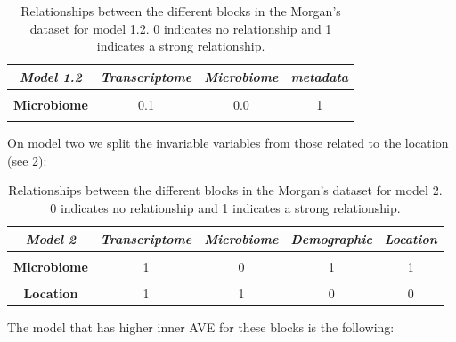 \documentclass[
  12pt,
  a4paper,
  twoside,
  openright]{book}
\begin{document}
\begin{table}[H]

\caption[Model 1.2 of the Morgan's dataset.]{\label{tab:morgan-model1-2}Relationships between the different blocks in the Morgan's dataset for model 1.2. 0 indicates no relationship and 1 indicates a strong relationship.}
\centering
\begin{tabular}[t]{|>{}c|c|c|>{}c|}
\hline
\em{\textbf{Model 1.2}} & \em{\textbf{Transcriptome}} & \em{\textbf{Microbiome}} & \em{\textbf{metadata}}\\
\hline
\textbf{\cellcolor{gray!6}{Transcriptome}} & \cellcolor{gray!6}{0.0} & \cellcolor{gray!6}{0.1} & \cellcolor{gray!6}{0}\\
\hline
\textbf{Microbiome} & 0.1 & 0.0 & 1\\
\hline
\textbf{\cellcolor{gray!6}{metadata}} & \cellcolor{gray!6}{0.0} & \cellcolor{gray!6}{1.0} & \cellcolor{gray!6}{0}\\
\hline
\end{tabular}
\end{table}

On model two we split the invariable variables from those related to the location (see \ref{tab:morgan-model2}):

\begin{table}[H]

\caption[Model 2 of the Morgan's dataset.]{\label{tab:morgan-model2}Relationships between the different blocks in the Morgan's dataset for model 2. 0 indicates no relationship and 1 indicates a strong relationship.}
\centering
\begin{tabular}[t]{|>{}c|c|c|c|>{}c|}
\hline
\em{\textbf{Model 2}} & \em{\textbf{Transcriptome}} & \em{\textbf{Microbiome}} & \em{\textbf{Demographic}} & \em{\textbf{Location}}\\
\hline
\textbf{\cellcolor{gray!6}{Transcriptome}} & \cellcolor{gray!6}{0} & \cellcolor{gray!6}{1} & \cellcolor{gray!6}{1} & \cellcolor{gray!6}{1}\\
\hline
\textbf{Microbiome} & 1 & 0 & 1 & 1\\
\hline
\textbf{\cellcolor{gray!6}{Demographic}} & \cellcolor{gray!6}{1} & \cellcolor{gray!6}{1} & \cellcolor{gray!6}{0} & \cellcolor{gray!6}{0}\\
\hline
\textbf{Location} & 1 & 1 & 0 & 0\\
\hline
\end{tabular}
\end{table}

The model that has higher inner AVE for these blocks is the following:
\end{document}
